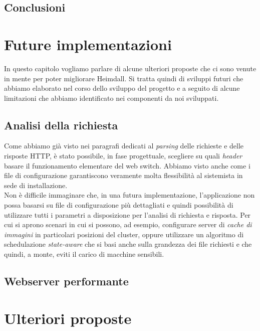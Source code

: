 \documentclass[italian]{tktltiki2}
\begin{document}
\subsection{Conclusioni}
\newpage
\section{Future implementazioni}
In questo capitolo vogliamo parlare di alcune ulteriori proposte che ci sono venute in mente per poter migliorare Heimdall. Si tratta quindi di sviluppi futuri che abbiamo elaborato nel corso dello sviluppo del progetto e a seguito di alcune limitazioni che abbiamo identificato nei componenti da noi sviluppati.
\subsection{Analisi della richiesta}
Come abbiamo già visto nei paragrafi dedicati al \emph{parsing} delle richieste e delle risposte HTTP, è stato possibile, in fase progettuale, scegliere su quali \emph{header} basare il funzionamento elementare del web switch. Abbiamo visto anche come i file di configurazione garantiscono veramente molta flessibilità al sistemista in sede di installazione.
\\
Non è difficile immaginare che, in una futura implementazione, l'applicazione non possa basarsi su file di configurazione più dettagliati e quindi possibilità di utilizzare tutti i parametri a disposizione per l'analisi di richiesta e risposta. Per cui si aprono scenari in cui si possono, ad esempio, configurare server di \emph{cache di immagini} in particolari posizioni del cluster, oppure utilizzare un algoritmo di schedulazione \emph{state-aware} che si basi anche sulla grandezza dei file richiesti e che quindi, a monte, eviti il carico di macchine sensibili.
\subsection{Webserver performante}

\newpage
\section{Ulteriori proposte}
\end{document}
